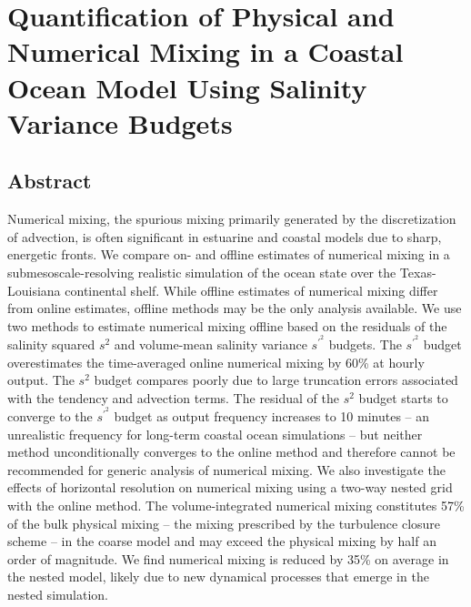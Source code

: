 


\chapter[footnote={This paper is published in \textit{Journal of Advances in Modeling Earth System}. Reprinted with permission from American Geophysical Union. Full citation:  Schlichting, D., Qu, L., Kobashi, D., \& Hetland, R. (2023). Quantification of physical and numerical mixing in a coastal ocean model using salinity variance budgets. Journal of Advances in Modeling Earth Systems, 15, e2022MS003380. \url{ https://doi.org/10.1029/2022MS003380}}]{Quantification of Physical and Numerical Mixing in a Coastal Ocean Model Using Salinity Variance Budgets}

\section{Abstract}
Numerical mixing, the spurious mixing primarily generated by the discretization of advection, is often significant in estuarine and coastal models due to sharp, energetic fronts. We compare on- and offline estimates of numerical mixing in a submesoscale-resolving realistic simulation of the ocean state over the Texas-Louisiana continental shelf. While offline estimates of numerical mixing differ from online estimates, offline methods may be the only analysis available. We use two methods to estimate numerical mixing offline based on the residuals of the salinity squared $s^2$ and volume-mean salinity variance $s^{\prime^2}$ budgets. The $s^{\prime^2}$ budget overestimates the time-averaged online numerical mixing by 60\% at hourly output. The $s^2$ budget compares poorly due to large truncation errors associated with the tendency and advection terms. The residual of the $s^2$ budget starts to converge to the $s^{\prime^2}$ budget as output frequency increases to 10 minutes -- an unrealistic frequency for long-term coastal ocean simulations -- but neither method unconditionally converges to the online method and therefore cannot be recommended for generic analysis of numerical mixing. We also investigate the effects of horizontal resolution on numerical mixing using a two-way nested grid with the online method. The volume-integrated numerical mixing constitutes 57\% of the bulk physical mixing -- the mixing prescribed by the turbulence closure scheme -- in the coarse model and may exceed the physical mixing by half an order of magnitude. We find numerical mixing is reduced by 35\% on average in the nested model, likely due to new dynamical processes that emerge in the nested simulation.


